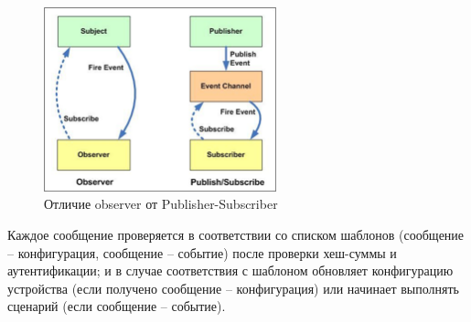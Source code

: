 \documentclass[a4paper,12pt]{article}
\begin{document}
\begin{figure}[H]
    \centering
    \includegraphics[width=0.6\textwidth]{images/Fig08.png}
    \caption{Отличие observer от Publisher-Subscriber \cite{IMG_observer_vs_pub_sub}}
    \label{fig:Observer_vs_pub_sub}
\end{figure}

Каждое сообщение проверяется в соответствии со списком шаблонов (сообщение -- конфигурация, сообщение -- событие) после проверки хеш-суммы и аутентификации; и в случае соответствия с
шаблоном обновляет конфигурацию устройства (если получено сообщение -- конфигурация) или начинает выполнять сценарий (если сообщение -- событие).



\newpage
\end{document}
